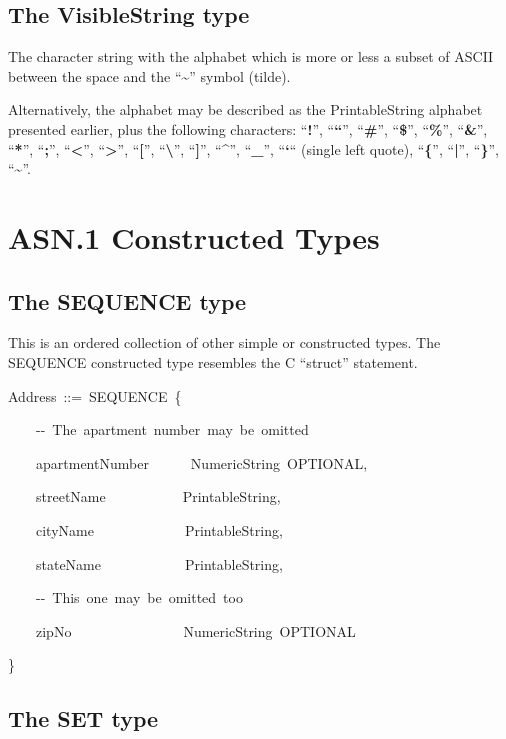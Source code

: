 \documentclass[english,oneside,12pt]{book}
\newenvironment{lyxcode}
{\par\begin{list}{}{
\setlength{\rightmargin}{\leftmargin}
\setlength{\listparindent}{0pt}%
\raggedright
\setlength{\itemsep}{0pt}
\setlength{\parsep}{0pt}
\normalfont\ttfamily}%
 \item[]}
{\end{list}}
\begin{document}
\subsection{The VisibleString type}

The character string with the alphabet which is more or less a subset
of ASCII between the space and the ``\textbf{\textasciitilde{}}''
symbol (tilde).

Alternatively, the alphabet may be described as the PrintableString
alphabet presented earlier, plus the following characters: ``\textbf{!}'',
``\textbf{``}'', ``\textbf{\#}'', ``\textbf{\$}'', ``\textbf{\%}'',
``\textbf{\&}'', ``\textbf{{*}}'', ``\textbf{;}'', ``\textbf{<}'',
``\textbf{>}'', ``\textbf{{[}}'', ``\textbf{\textbackslash{}}'',
``\textbf{{]}}'', ``\textbf{\textasciicircum{}}'', ``\textbf{\_}'',
``\textbf{`}`` (single left quote), ``\textbf{\{}'', ``\textbf{|}'',
``\textbf{\}}'', ``\textbf{\textasciitilde{}}''.


\section{ASN.1 Constructed Types}


\subsection{The SEQUENCE type}

This is an ordered collection of other simple or constructed types.
The SEQUENCE constructed type resembles the C ``struct'' statement.
\begin{lyxcode}
Address~::=~SEQUENCE~\{

~~~~-{}-~The~apartment~number~may~be~omitted

~~~~apartmentNumber~~~~~~NumericString~OPTIONAL,

~~~~streetName~~~~~~~~~~~PrintableString,

~~~~cityName~~~~~~~~~~~~~PrintableString,

~~~~stateName~~~~~~~~~~~~PrintableString,

~~~~-{}-~This~one~may~be~omitted~too

~~~~zipNo~~~~~~~~~~~~~~~~NumericString~OPTIONAL

\}
\end{lyxcode}

\subsection{The SET type}
\end{document}
